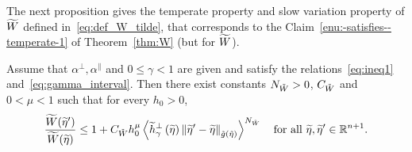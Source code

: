 \documentclass[AHL,Unicode,longabstracts,published]{cedram}
\newcommand{\bbR}{\mathbb{R}}
\let\oldtilde\tilde
\renewcommand*{\tilde}[1]{\mathchoice{\widetilde{#1}}{\widetilde{#1}}{\oldtilde{#1}}{\oldtilde{#1}}}
\newcommand{\bbR}{\mathbb{R}}
\begin{document}
The next proposition gives the temperate property and slow variation property of $\tilde{W}$ defined in~\eqref{eq:def_W_tilde}, that corresponds to the Claim~\ref{enu:-satisfies--temperate-1} of Theorem~\ref{thm:W} (but for $\tilde{W}$).

\begin{cBoxB}{}
\begin{prop}
Assume that $\alpha^{\perp},\alpha^{\parallel}$ and $0\leq\gamma<1$ are given and satisfy the relations~\eqref{eq:ineq1} and~\eqref{eq:gamma_interval}. Then there exist constants $N_{\tilde{W}}>0$, $C_{\tilde{W}}$ and $0<\mu<1$ such that for every $h_{0}>0$,
\begin{align}\label{eq:w2}
\frac{\tilde{W}(\tilde{\eta}')}{\tilde{W}(\tilde{\eta})}\le1+C_{\tilde{W}}h_{0}^{\mu}\left\langle\tilde{h}_{\gamma}^{\perp}\left(\tilde{\eta}\right)\left\|\tilde{\eta}'-\tilde{\eta}\right\|_{\tilde{g}\left(\tilde{\eta}\right)}\right\rangle^{N_{\tilde{W}}}\quad\text{for all }\tilde{\eta},\tilde{\eta}'\in\bbR^{n+1}.
\end{align}
\end{prop}
\end{cBoxB}
\end{document}
